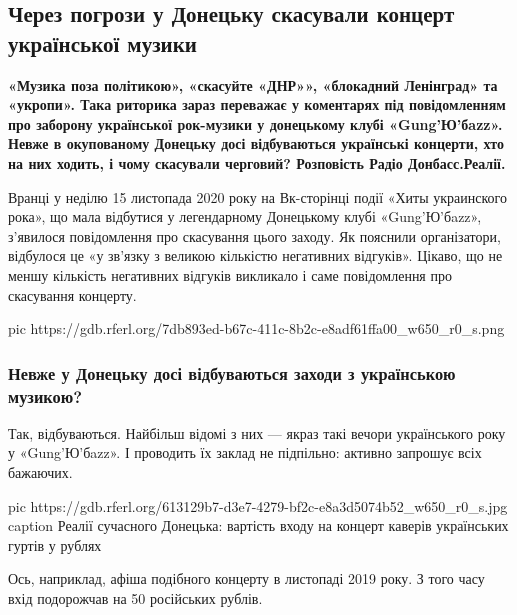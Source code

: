  
 
 
 
\subsection{Через погрози у Донецьку скасували концерт української музики}
\label{sec:16_11_2020.news.ua.radio_svoboda.1.dnr.doneck_koncert_ukr_muzyka}

{\bfseries
«Музика поза політикою», «скасуйте «ДНР»», «блокадний Ленінград» та
«укропи». Така риторика зараз переважає у коментарях під повідомленням
про заборону української рок-музики у донецькому клубі «Gung'Ю'бazz».
Невже в окупованому Донецьку досі відбуваються українські концерти, хто на
них ходить, і чому скасували черговий? Розповість Радіо Донбасс.Реалії.
}

Вранці у неділю 15 листопада 2020 року на Вк-сторінці події «Хиты украинского
рока», що мала відбутися у легендарному Донецькому клубі «Gung'Ю'бazz»,
з’явилося повідомлення про скасування цього заходу. Як пояснили організатори,
відбулося це «у зв’язку з великою кількістю негативних відгуків». Цікаво, що не
меншу кількість негативних відгуків викликало і саме повідомлення про
скасування концерту.

\ifcmt
pic https://gdb.rferl.org/7db893ed-b67c-411c-8b2c-e8adf61ffa00_w650_r0_s.png
\fi

\subsubsection{Невже у Донецьку досі відбуваються заходи з українською музикою?}

Так, відбуваються. Найбільш відомі з них --- якраз такі вечори українського
року у «Gung'Ю'бazz». І проводить їх заклад не підпільно: активно запрошує
всіх бажаючих.

\ifcmt
pic https://gdb.rferl.org/613129b7-d3e7-4279-bf2c-e8a3d5074b52_w650_r0_s.jpg
caption Реалії сучасного Донецька: вартість входу на концерт каверів українських гуртів у рублях
\fi

Ось, наприклад, афіша подібного концерту в листопаді 2019 року. З того часу
вхід подорожчав на 50 російських рублів.

